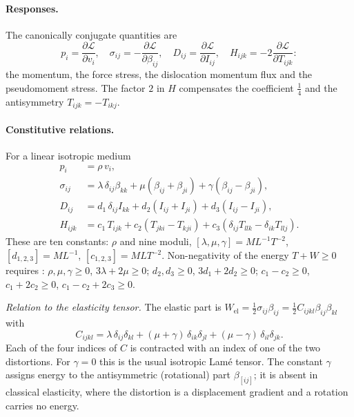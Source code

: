 \documentclass[12pt,a4paper]{article}
\begin{document}
\paragraph{Responses.} The canonically conjugate quantities are
\cite[eq.~(4)]{lazar2010pla}
\begin{equation}
p_i=\frac{\partial\mathcal L}{\partial v_i},\quad
\sigma_{ij}=-\frac{\partial\mathcal L}{\partial\beta_{ij}},\quad
D_{ij}=\frac{\partial\mathcal L}{\partial I_{ij}},\quad
H_{ijk}=-2\frac{\partial\mathcal L}{\partial T_{ijk}}:
\label{eq:responses}
\end{equation}
the momentum, the force stress, the dislocation momentum flux and the pseudomoment
stress. The factor $2$ in $H$ compensates the coefficient $\tfrac14$ and the
antisymmetry $T_{ijk}=-T_{ikj}$.

\paragraph{Constitutive relations.} For a linear isotropic medium
\cite[eqs.~(10)--(13)]{lazar2010pla}
\begin{equation}
\begin{aligned}
p_i&=\rho\,v_i,\\
\sigma_{ij}&=\lambda\,\delta_{ij}\beta_{kk}+\mu(\beta_{ij}+\beta_{ji})+\gamma(\beta_{ij}-\beta_{ji}),\\
D_{ij}&=d_1\,\delta_{ij}I_{kk}+d_2(I_{ij}+I_{ji})+d_3(I_{ij}-I_{ji}),\\
H_{ijk}&=c_1\,T_{ijk}+c_2(T_{jki}-T_{kji})+c_3(\delta_{ij}T_{llk}-\delta_{ik}T_{llj}).
\end{aligned}
\label{eq:constit}
\end{equation}
These are ten constants: $\rho$ and nine moduli, $[\lambda,\mu,\gamma]=ML^{-1}T^{-2}$,
$[d_{1,2,3}]=ML^{-1}$, $[c_{1,2,3}]=MLT^{-2}$. Non-negativity of the energy
$T+W\ge0$ requires \cite[eq.~(14)]{lazar2010pla}: $\rho,\mu,\gamma\ge0$,
$3\lambda+2\mu\ge0$; $d_2,d_3\ge0$, $3d_1+2d_2\ge0$; $c_1-c_2\ge0$,
$c_1+2c_2\ge0$, $c_1-c_2+2c_3\ge0$.

\textit{Relation to the elasticity tensor.} The elastic part is
$W_{\text{el}}=\tfrac12\sigma_{ij}\beta_{ij}=\tfrac12 C_{ijkl}\beta_{ij}\beta_{kl}$ with
\[
C_{ijkl}=\lambda\,\delta_{ij}\delta_{kl}+(\mu+\gamma)\,\delta_{ik}\delta_{jl}+(\mu-\gamma)\,\delta_{il}\delta_{jk}.
\]
Each of the four indices of $C$ is contracted with an index of one of the two
distortions. For $\gamma=0$ this is the usual isotropic Lam\'e tensor. The constant
$\gamma$ assigns energy to the antisymmetric (rotational) part $\beta_{[ij]}$; it is
absent in classical elasticity, where the distortion is a displacement gradient and
a rotation carries no energy.
\end{document}
